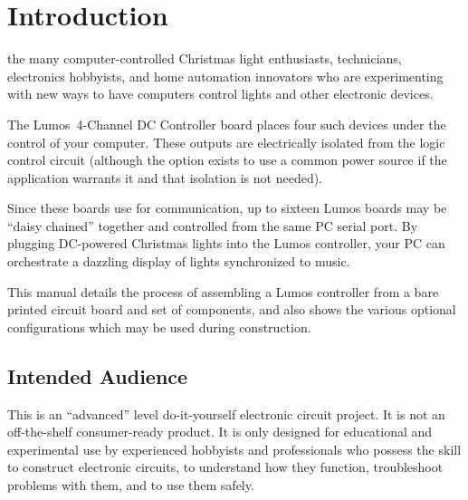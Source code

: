 \documentclass[letterpaper,twoside,onecolumn,openright,final]{memoir}
\begin{document}
\begin{center}
\end{center}

\newpage
\tableofcontents
\newpage
\listoffigures
\listoftables

\mainmatter

\chapter{Introduction}
 the many computer-controlled
Christmas light enthusiasts,  technicians, electronics hobbyists,
and home automation innovators who are experimenting with new ways to have computers
control lights and other electronic devices.

The Lumos\TM\ 4-Channel DC Controller board places four such devices under the control
of your computer.  These outputs are 
electrically isolated from the logic control circuit (although the option exists to use
a common power source if the application warrants it and that isolation is not needed).

Since these boards use  for communication, up to sixteen Lumos
boards may be ``daisy chained'' together and controlled from 
the same PC serial port.
By plugging DC-powered Christmas lights into the Lumos controller, your PC can orchestrate
a dazzling display of lights synchronized to music.

This manual details the process of assembling a Lumos controller from a bare printed
circuit board and set of components, and also shows the various optional configurations
which may be used during construction.

\section{Intended Audience}
This is an ``advanced'' level do-it-yourself electronic circuit project.  It is not
an off-the-shelf consumer-ready product.  It is only designed for educational and experimental
use by experienced hobbyists and professionals who possess the skill to construct electronic
circuits, to understand how they function, troubleshoot problems with them, and to use them safely.






\end{document}
